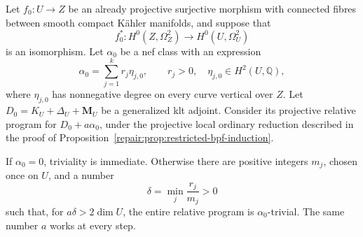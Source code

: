 \begin{proposition}
\label{repair:prop:relative-nqc-uniform}
Let $f_0:U\to Z$ be an already projective surjective morphism with
connected fibres between smooth compact
K\"ahler manifolds, and suppose that
\[
 f_0^*:H^0(Z,\Omega_Z^2)\longrightarrow H^0(U,\Omega_U^2)
\]
is an isomorphism. Let $\alpha_0$ be a nef class with an expression
\[
       \alpha_0=\sum_{j=1}^k r_j\eta_{j,0},\qquad
       r_j>0,\quad \eta_{j,0}\in H^2(U,\mathbb Q),
\]
where $\eta_{j,0}$ has nonnegative degree on every curve vertical
over $Z$. Let $D_0=K_U+\Delta_U+\mathbf M_U$ be a generalized klt
adjoint. Consider its projective relative program for
$D_0+a\alpha_0$, under the projective local ordinary reduction described in the
proof of Proposition~\ref{repair:prop:restricted-bpf-induction}.

If $\alpha_0=0$, triviality is immediate. Otherwise there are
positive integers $m_j$, chosen once on $U$, and a number
\[
                         \delta=\min_j\frac{r_j}{m_j}>0
\]
such that, for $a\delta>2\dim U$, the entire relative program is
$\alpha_0$-trivial. The same number $a$ works at every step.
\end{proposition}

